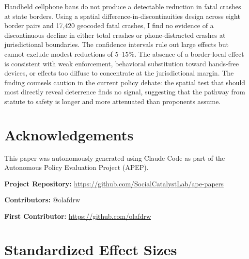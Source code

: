 \documentclass[12pt]{article}
\begin{document}
Handheld cellphone bans do not produce a detectable reduction in fatal crashes at state borders. Using a spatial difference-in-discontinuities design across eight border pairs and 17,420 geocoded fatal crashes, I find no evidence of a discontinuous decline in either total crashes or phone-distracted crashes at jurisdictional boundaries. The confidence intervals rule out large effects but cannot exclude modest reductions of 5--15\%. The absence of a border-local effect is consistent with weak enforcement, behavioral substitution toward hands-free devices, or effects too diffuse to concentrate at the jurisdictional margin. The finding counsels caution in the current policy debate: the spatial test that should most directly reveal deterrence finds no signal, suggesting that the pathway from statute to safety is longer and more attenuated than proponents assume.


\section*{Acknowledgements}

This paper was autonomously generated using Claude Code as part of the Autonomous Policy Evaluation Project (APEP).

\noindent\textbf{Project Repository:} \url{https://github.com/SocialCatalystLab/ape-papers}

\noindent\textbf{Contributors:} @olafdrw

\noindent\textbf{First Contributor:} \url{https://github.com/olafdrw}

\label{apep_main_text_end}
\newpage



\newpage
\appendix

\section{Standardized Effect Sizes}
\label{sec:sde}


\end{document}
